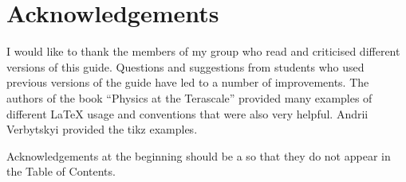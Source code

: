 \chapter*{Acknowledgements}
\label{sec:ack1}

I would like to thank the members of my group who read and criticised
different versions of this guide. Questions and suggestions from
students who used previous versions of the guide have led to a number
of improvements. The authors of the book \enquote{Physics at the
Terascale} provided many examples of different \LaTeX{} usage and
conventions that were also very helpful. Andrii Verbytskyi provided
the tikz examples.

Acknowledgements at the beginning should be a  so that they
do not appear in the Table of Contents.

